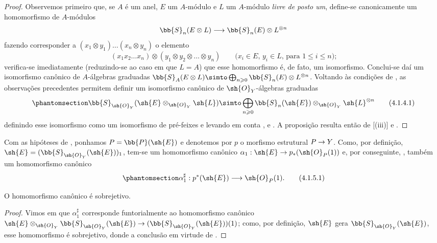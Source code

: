 \documentclass[oneside,10pt]{amsart}
\makeatletter
\renewcommand{\leq}{\leqslant}
\renewcommand{\geq}{\geqslant}
\newcommand{\ega@arrow}[2]{\mathchoice{#1}{#2}{#2}{#2}}
\renewcommand{\to}{\ega@arrow{\longrightarrow}{\rightarrow}}
\let\EGAOriginalLabel\label
\renewcommand{\label}[1]{\phantomsection\EGAOriginalLabel{#1}}
\makeatother
\begin{document}
\begin{proof}
Observemos primeiro que, se $A$ é um anel, $E$ um $A$-módulo e $L$ um $A$-módulo \emph{livre de posto um}, define-se canonicamente um homomorfismo de $A$-módulos
\[
  \bb{S}_n(E\otimes L) \to \bb{S}_n(E)\otimes L^{\otimes n}
\]
fazendo corresponder a $(x_1\otimes y_1)\ldots(x_n\otimes y_n)$ o elemento
\[
  (x_1x_2\ldots x_n)\otimes(y_1\otimes y_2\otimes\ldots\otimes y_n)
  \qquad\mbox{($x_i\in E$, $y_i\in L$, para $1\leq i\leq n$);}
\]
verifica-se imediatamente (reduzindo-se ao caso em que $L=A$) que esse homomorfismo é, de fato, um isomorfismo.
Conclui-se daí um isomorfismo canônico de $A$-álgebras graduadas $\bb{S}_A(E\otimes L)\simto\bigoplus_{n\geq0}\bb{S}_n(E)\otimes L^{\otimes n}$.
Voltando às condições de , as observações precedentes permitem definir um isomorfismo canônico de $\sh{O}_Y$-álgebras graduadas
\[
\label{II.4.1.4.1}
  \bb{S}_{\sh{O}_Y}(\sh{E}\otimes_{\sh{O}_Y}\sh{L}) \simto \bigoplus_{n\geq0}\bb{S}_n(\sh{E})\otimes_{\sh{O}_Y}\sh{L}^{\otimes n}
  \tag{4.1.4.1}
\]
definindo esse isomorfismo como um isomorfismo de pré-feixes e levando em conta ,  e .
A proposição resulta então de [(iii)] e .
\end{proof}

\begin{env}[4.1.5]
\label{II.4.1.5}
Com as hipóteses de , ponhamos $P=\bb{P}(\sh{E})$ e denotemos por $p$ o morfismo estrutural $P\to Y$.
Como, por definição, $\sh{E}=(\bb{S}_{\sh{O}_Y}(\sh{E}))_1$, tem-se um homomorfismo canônico $\alpha_1:\sh{E}\to p_*(\sh{O}_P(1))$  e, por conseguinte, , também um homomorfismo canônico
\[
\label{II.4.1.5.1}
  \alpha_1^\sharp: p^*(\sh{E}) \to \sh{O}_P(1).
  \tag{4.1.5.1}
\]
\end{env}

\begin{proposition}[4.1.6]
\label{II.4.1.6}
O homomorfismo canônico  é sobrejetivo.
\end{proposition}

\begin{proof}
Vimos em  que $\alpha_1^\sharp$ corresponde funtorialmente ao homomorfismo canônico $\sh{E}\otimes_{\sh{O}_Y}\bb{S}_{\sh{O}_Y}(\sh{E})\to(\bb{S}_{\sh{O}_Y}(\sh{E}))(1)$;
como, por definição, $\sh{E}$ gera $\bb{S}_{\sh{O}_Y}(\sh{E})$, esse homomorfismo é sobrejetivo, donde a conclusão em virtude de .
\end{proof}
\end{document}
